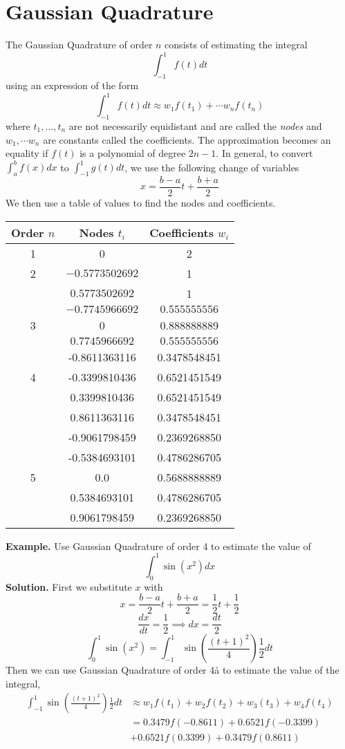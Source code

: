 \documentclass[openany]{report}
\begin{document}
\section{Gaussian Quadrature}
The Gaussian Quadrature of order $n$ consists of estimating the integral 
\[\int_{-1}^{1}f(t)dt\]
using an expression of the form 
\[\int_{-1}^{1}f(t)dt \approx w_1f(t_1) + \cdots w_nf(t_n)\]
where $t_1, \ldots, t_n$  are not necessarily equidistant and are called the \emph{nodes} and $w_1,\cdots w_n$ are constants called the coefficients. The approximation becomes an equality if $f(t)$ is a polynomial of degree $2n-1$. In general, to convert $\int_a^bf(x)dx$ to $\int_{-1}^{1}g(t)dt$, we use the following change of variables
\[x = \frac{b-a}{2}t + \frac{b+a}{2}\]
We then use a table of values to find the nodes and coefficients.
\begin{center}
    \begin{tabular}{c|cc}
        Order $n$ & Nodes $t_i$ & Coefficients $w_i$\\
        \hline
        1 & 0 & 2\\
        \hline
        2 & $-0.5773502692$ & 1\\
        & $0.5773502692$ & 1\\
        \hline
        & $-0.7745966692$ & $0.555555556$\\
        3 & 0 & 0.888888889\\
        & $0.7745966692$ & $0.555555556$\\
        \hline
        & -0.8611363116 &0.3478548451\\
        4&-0.3399810436& 0.6521451549\\
        &0.3399810436 &0.6521451549\\
        &0.8611363116 &0.3478548451\\
        \hline
        &-0.9061798459 &0.2369268850\\
        &-0.5384693101& 0.4786286705\\
        5 &0.0 &0.5688888889\\
        &0.5384693101 &0.4786286705\\
        &0.9061798459& 0.2369268850\\
    \end{tabular}
\end{center}
\noindent
\textbf{Example.} Use Gaussian Quadrature of order 4 to estimate the value of 
\[\int_{0}^1\sin(x^2)dx\]
\textbf{Solution.} First we substitute $x$ with 
\[x = \frac{b-a}{2}t + \frac{b+a}{2} = \frac{1}{2}t +\frac{1}{2}\]
\[\frac{dx}{dt} = \frac{1}{2} \implies dx = \frac{dt}{2}\]
\[\int_0^1 \sin(x^2) = \int_{-1}^1 \sin \left(\frac{(t+1)^2}{4}\right) \frac{1}{2}dt\]
Then we can use Gaussian Quadrature of order 4å to estimate the value of the integral,
\begin{align*}
    \int_{-1}^1 \sin \left(\frac{(t+1)^2}{4}\right) \frac{1}{2}dt &\approx w_1f(t_1) + w_2f(t_2) + w_3(t_3) + w_4f(t_4)\\
    &= 0.3479f(-0.8611) + 0.6521f(-0.3399)\\
    &+0.6521f(0.3399) + 0.3479f(0.8611)\\
\end{align*}
\end{document}
